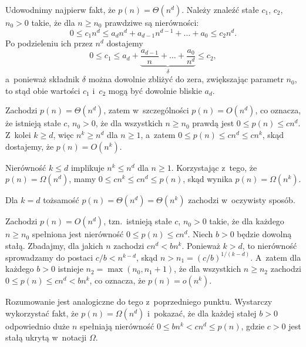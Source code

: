 Udowodnimy najpierw fakt, że $p(n)=\Theta(n^d)$.
Należy znaleźć stałe $c_1$, $c_2$, $n_0>0$ takie, że dla $n\ge n_0$ prawdziwe są nierówności:
\[
	0 \le c_1n^d \le a_dn^d+a_{d-1}n^{d-1}+\dots+a_0 \le c_2n^d.
\]
Po podzieleniu ich przez $n^d$ dostajemy
\[
	0 \le c_1 \le a_d+\underbrace{\frac{a_{d-1}}{n}+\dots+\frac{a_0}{n^d}}_\delta \le c_2,
\]
a~ponieważ składnik $\delta$ można dowolnie zbliżyć do zera, zwiększając parametr $n_0$, to stąd obie wartości $c_1$ i~$c_2$ mogą być dowolnie bliskie $a_d$.

\subproblem %
Zachodzi $p(n)=\Theta(n^d)$, zatem w~szczególności $p(n)=O(n^d)$, co oznacza, że istnieją stałe $c$, $n_0>0$, że dla wszystkich $n\ge n_0$ prawdą jest $0\le p(n)\le cn^d$.
Z~kolei $k\ge d$, więc $n^k\ge n^d$ dla $n\ge1$, a~zatem $0\le p(n)\le cn^d\le cn^k$, skąd dostajemy, że $p(n)=O(n^k)$.

\subproblem %
Nierówność $k\le d$ implikuje $n^k\le n^d$ dla $n\ge1$.
Korzystając z~tego, że $p(n)=\Omega(n^d)$, mamy $0\le cn^k\le cn^d\le p(n)$, skąd wynika $p(n)=\Omega(n^k)$.

\subproblem %
Dla $k=d$ tożsamość $p(n)=\Theta(n^d)=\Theta(n^k)$ zachodzi w~oczywisty sposób.

\subproblem %
Zachodzi $p(n)=O(n^d)$, tzn.\ istnieją stałe $c$, $n_0>0$ takie, że dla każdego $n\ge n_0$ spełniona jest nierówność $0\le p(n)\le cn^d$.
Niech $b>0$ będzie dowolną stałą.
Zbadajmy, dla jakich $n$ zachodzi $cn^d<bn^k$.
Ponieważ $k>d$, to nierówność sprowadzamy do postaci $c/b<n^{k-d}$, skąd $n>n_1=(c/b)^{1/(k-d)}$.
A~zatem dla każdego $b>0$ istnieje $n_2=\max(n_0,n_1+1)$, że dla wszystkich $n\ge n_2$ zachodzi $0\le p(n)\le cn^d<bn^k$, co oznacza, że $p(n)=o(n^k)$.

\subproblem %
Rozumowanie jest analogiczne do tego z~poprzedniego punktu.
Wystarczy wykorzystać fakt, że $p(n)=\Omega(n^d)$ i~pokazać, że dla każdej stałej $b>0$ odpowiednio duże $n$ spełniają nierówność $0\le bn^k<cn^d\le p(n)$, gdzie $c>0$ jest stałą ukrytą w~notacji $\Omega$.
